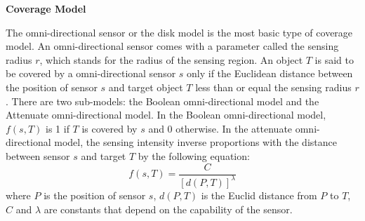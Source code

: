 \documentclass[final]{elsarticle}
\begin{document}
\noindent\textbf{Coverage Model}

The omni-directional sensor or the disk model is the most basic type of coverage model. An omni-directional sensor comes with a parameter called the sensing radius $r$, which stands for the radius of the sensing region. An object $ T $ is said to be covered by a omni-directional sensor $ s $ only if the Euclidean distance between the position of sensor $ s $ and target object $ T $ less than or equal the sensing radius $r$. There are two sub-models: the Boolean omni-directional model and the Attenuate omni-directional model. In the Boolean omni-directional model, $f(s, T)$ is 1 if $ T $ is covered by $ s $ and 0 otherwise. In the attenuate omni-directional model, the sensing intensity inverse proportions with the distance between sensor $ s $ and target $ T $ by the following equation:
\begin{equation}
\label{eq1}
f({s},T) = \frac{C}{{{{\left[ {d(P,T)} \right]}^\lambda }}}
\end{equation}
where $ P $ is the position of sensor $ s $, $ d(P,T) $ is the Euclid distance from $ P $ to $ T $, $ C $ and $ \lambda $ are constants that depend on the capability of the sensor. 
\end{document}
